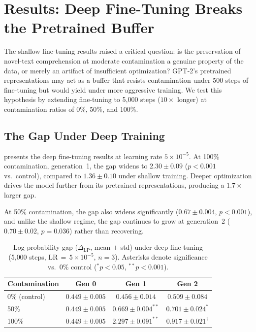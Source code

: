 \documentclass{article}
\begin{document}
\section{Results: Deep Fine-Tuning Breaks the Pretrained Buffer}
\label{sec:results-deep}

The shallow fine-tuning results raised a critical question: is the preservation of novel-text comprehension at moderate contamination a genuine property of the data, or merely an artifact of insufficient optimization?
GPT-2's pretrained representations may act as a buffer that resists contamination under 500 steps of fine-tuning but would yield under more aggressive training.
We test this hypothesis by extending fine-tuning to 5{,}000 steps ($10\times$ longer) at contamination ratios of 0\%, 50\%, and 100\%.

\subsection{The Gap Under Deep Training}

 presents the deep fine-tuning results at learning rate $5 \times 10^{-5}$.
At 100\% contamination, generation~1, the gap widens to $\mathbf{2.30 \pm 0.09}$ ($p < 0.001$ vs.\ control), compared to $1.36 \pm 0.10$ under shallow training.
Deeper optimization drives the model further from its pretrained representations, producing a $1.7\times$ larger gap.

At 50\% contamination, the gap also widens significantly ($0.67 \pm 0.004$, $p < 0.001$), and unlike the shallow regime, the gap continues to grow at generation~2 ($0.70 \pm 0.02$, $p = 0.036$) rather than recovering.

\begin{table}[htbp]
\centering
\caption{Log-probability gap ($\Delta_{\text{LP}}$, mean $\pm$ std) under deep fine-tuning (5{,}000 steps, LR\,$=$\,$5 \times 10^{-5}$, $n{=}3$). Asterisks denote significance vs.\ 0\% control ($^{*}p < 0.05$, $^{**}p < 0.001$).}
\label{tab:gap-v4}
\begin{tabular}{lccc}
\toprule
Contamination & Gen 0 & Gen 1 & Gen 2 \\
\midrule
0\% (control)   & $0.449 \pm 0.005$ & $0.456 \pm 0.014$ & $0.509 \pm 0.084$ \\
50\%            & $0.449 \pm 0.005$ & $0.669 \pm 0.004^{**}$ & $0.701 \pm 0.024^{*}$ \\
100\%           & $0.449 \pm 0.005$ & $\mathbf{2.297 \pm 0.091}^{**}$ & $0.917 \pm 0.021^{\dagger}$ \\
\bottomrule
\end{tabular}

\smallskip
{}
\end{table}
\end{document}
